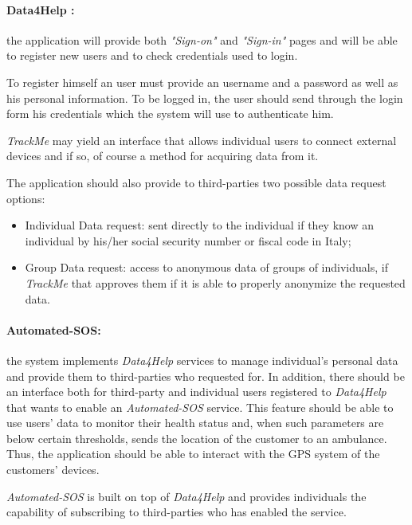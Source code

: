 \documentclass[a4paper]{article}
\begin{document}
    \paragraph{Data4Help :}
    the application will provide both \textit{"Sign-on"} and \textit{"Sign-in"} pages and will be able to register new users and to check credentials used to login.
    
    To register himself an user must provide an username and a password as well as his personal information. To be logged in, the user should send through the login form his credentials which the system will use to authenticate him.
    
    \textit{TrackMe} may yield an interface that allows individual users to connect external devices and if so, of course a method for acquiring data from it.
    
    The application should also provide to third-parties two possible data request options:
    \begin{itemize}
        \item Individual Data request: sent directly to the individual if they know an  individual by his/her social security number or fiscal code in Italy;
        \item Group Data request: access  to  anonymous  data  of  groups  of  individuals, if \textit{TrackMe}  that  approves  them  if  it  is  able  to  properly  anonymize  the  requested  data.
    \end{itemize}
    
    \paragraph{Automated-SOS:} the system implements \textit{Data4Help} services to manage individual's personal data and provide them to third-parties who requested for. In addition, there should be an interface both for third-party and individual users registered to \textit{Data4Help} that wants to enable an \textit{Automated-SOS} service. This feature should be able to use users' data to monitor their health status and, when such parameters are below certain thresholds, sends the location of the customer to an ambulance. Thus, the application should be able to interact with the GPS system of the customers' devices.
    
    \textit{Automated-SOS} is built on top of \textit{Data4Help} and provides individuals the capability of subscribing to third-parties who has enabled the service.
    
\end{document}
